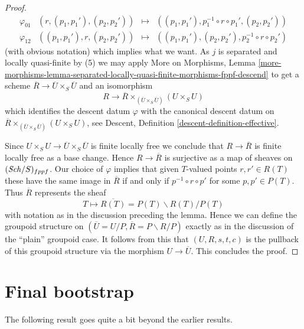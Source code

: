 \begin{proof}
$$\begin{matrix}
\varphi_{01} & (r, (p_1, p_1'), (p_2, p_2')) & \mapsto &
((p_1, p_1'), p_1^{-1} \circ r \circ p_1', (p_2, p_2')) \\
\varphi_{12} & ((p_1, p_1'), r, (p_2, p_2')) & \mapsto &
((p_1, p_1'), (p_2, p_2'), p_2^{-1} \circ r \circ p_2')
\end{matrix}
$$
(with obvious notation) which implies what we want.
As $j$ is separated and locally quasi-finite by (5) we may apply
More on Morphisms, Lemma
\ref{more-morphisms-lemma-separated-locally-quasi-finite-morphisms-fppf-descend}
to get a scheme $\overline{R} \to \overline{U} \times_S \overline{U}$
and an isomorphism
$$
R \to \overline{R} \times_{(\overline{U} \times_S \overline{U})} (U \times_S U)
$$
which identifies the descent datum $\varphi$ with the canonical
descent datum on
$\overline{R} \times_{(\overline{U} \times_S \overline{U})} (U \times_S U)$,
see
Descent, Definition \ref{descent-definition-effective}.

\medskip\noindent
Since $U \times_S U \to \overline{U} \times_S \overline{U}$ is finite
locally free we conclude that $R \to \overline{R}$ is finite locally free
as a base change. Hence $R \to \overline{R}$ is surjective as a map of
sheaves on $(\mathit{Sch}/S)_{fppf}$.
Our choice of $\varphi$ implies that given $T$-valued points $r, r' \in R(T)$
these have the same image in $\overline{R}$ if and only if
$p^{-1} \circ r \circ p'$ for some $p, p' \in P(T)$. Thus
$\overline{R}$ represents the sheaf
$$
T \longmapsto  \overline{R(T)} = P(T)\backslash R(T)/P(T)
$$
with notation as in the discussion preceding the lemma.
Hence we can define the groupoid structure on
$(\overline{U} = U/P, \overline{R} = P\backslash R/P)$ exactly as in
the discussion of the ``plain'' groupoid case.
It follows from this that $(U, R, s, t, c)$ is the pullback of
this groupoid structure via the morphism $U \to \overline{U}$.
This concludes the proof.
\end{proof}

\section{Final bootstrap}
\label{bootstrap-section-final-bootstrap}
The following result goes quite a bit beyond the earlier results.

